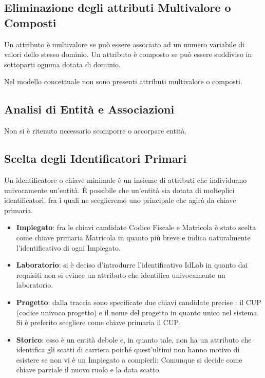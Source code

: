 \subsection{Eliminazione degli attributi Multivalore o Composti}
Un attributo è multivalore se può essere associato ad un numero variabile di valori dello stesso dominio. Un attributo è composto se può essere suddiviso in sottoparti ognuna dotata di dominio.

Nel modello concettuale non sono presenti attributi multivalore o composti.

\subsection{Analisi di Entità e Associazioni}
Non si è ritenuto necessario scomporre o accorpare entità.\\

\subsection{Scelta degli Identificatori Primari}

Un identificatore o chiave minimale è un insieme di attributi che individuano univocamente un'entità. È possibile che un'entità sia dotata di molteplici identificatori, fra i quali ne sceglieremo uno principale che agirà da chiave primaria.

\begin{itemize}
    \item \textbf{Impiegato}: fra le chiavi candidate Codice Fiscale e Matricola è stato scelta come chiave primaria Matricola in quanto più breve e indica naturalmente l'identificativo di ogni Impiegato.

    \item \textbf{Laboratorio}: si è deciso d'introdurre l'identificativo IdLab in quanto dai requisiti non si evince un attributo che identifica univocamente un laboratorio.

    \item \textbf{Progetto}: dalla traccia sono specificate due chiavi candidate precise : il CUP (codice univoco progetto) e il nome del progetto in quanto unico nel sistema. Si è preferito scegliere come chiave primaria il CUP.
    
    \item \textbf{Storico}: esso è un entità debole e, in quanto tale, non ha un attributo che identifica gli scatti di carriera poiché quest'ultimi non hanno motivo di esistere se non vi è un Impiegato a compierli; Comunque si decide come chiave parziale il nuovo ruolo e la data scatto.
\end{itemize} 


